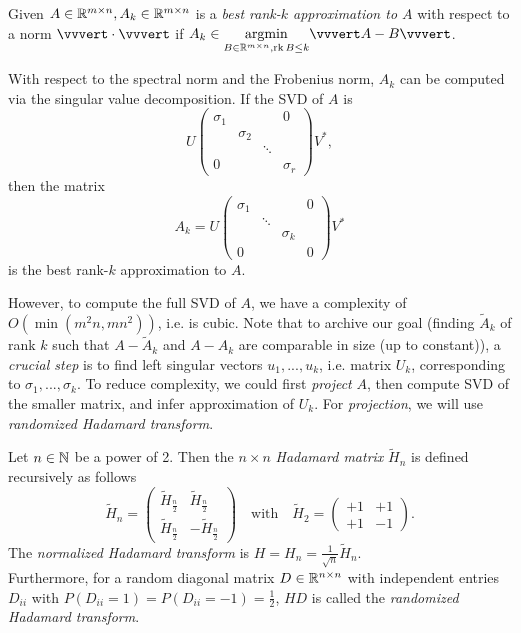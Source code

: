 \begin{definition}Given $A\in \mathbb{R}^{m \times n}, A_k \in \mathbb{R}^{m\times n}$ is a \emph{best rank-$k$ approximation to $A$} with respect to a norm $\vvvert \cdot \vvvert$ if $A_k\in \underset{B\in \R^{m \times n}, \operatorname{rk} B\leq k}{\operatorname{argmin}}\vvvert A-B\vvvert$.
\end{definition} \vspace{-1pc}
\begin{remark*} With respect to the spectral norm and the Frobenius norm, $A_k$ can be computed via the singular value decomposition. If the SVD of $A$ is 
$$
U\begin{pmatrix}
\sigma_1 &    			&    & 0 \\
	           &\sigma_2	&	  &	\\
	           &				&	\ddots & \\
	0           &				&	 & \sigma_r
\end{pmatrix}V^*,
$$
then the matrix
$$
A_k = U\begin{pmatrix}
\sigma_1 &    			&    & 0 \\
	           &\ddots	&	  &	\\
	           &				&	\sigma_k & \\
	0           &				&	 & 0
\end{pmatrix}V^*
$$
is the best rank-$k$ approximation to $A$.
\end{remark*}
However, to compute the full SVD of $A$, we have a complexity of $O(\min(m^2n,mn^2))$, i.e. is cubic. Note that to archive our goal (finding $\tilde{A}_k$ of rank $k$ such that $A-\tilde{A}_k$ and $A-A_k$ are comparable in size (up to constant)), a \emph{crucial step} is to find left singular vectors $u_1,...,u_k$, i.e. matrix $U_k$, corresponding to $\sigma_1,...,\sigma_k$. To reduce complexity, we could first \emph{project} $A$, then compute SVD of the smaller matrix, and infer approximation of $U_k$. For \emph{projection}, we will use \emph{randomized Hadamard transform}.

\begin{definition}\label{def:hadamard}
Let $n\in\mathbb{N}$ be a power of 2. Then the $n\times n$ \emph{Hadamard matrix} $\tilde{H}_n$ is defined recursively as follows 
\begin{equation}
\tilde{H}_n = 
\begin{pmatrix}
\tilde{H}_{\frac{n}{2}} & \tilde{H}_{\frac{n}{2}} \\
\tilde{H}_{\frac{n}{2}} & - \tilde{H}_{\frac{n}{2}}
\end{pmatrix}
\quad \text{with}\quad
\tilde{H}_2 = 
\begin{pmatrix}
+1 & +1 \\
+1 & -1
\end{pmatrix}.
\end{equation}
The \emph{normalized Hadamard transform} is $H=H_n =\frac{1}{\sqrt{n}} \tilde{H}_n$. \\
Furthermore, for a random diagonal matrix $D\in \mathbb{R}^{n\times n}$ with independent entries $D_{ii}$ with $P(D_{ii}=1)=P(D_{ii}=-1)=\frac{1}{2}$, $HD$ is called the \emph{randomized Hadamard transform}.
\end{definition}

